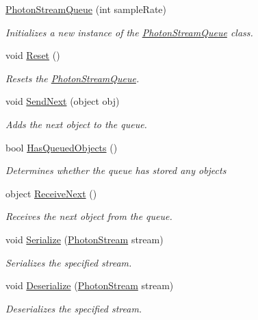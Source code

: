 \begin{DoxyCompactItemize}
\item 
\hyperlink{class_photon_stream_queue_a1c2a5d3c8a990b78b07650b0e1370eeb}{Photon\+Stream\+Queue} (int sample\+Rate)
\begin{DoxyCompactList}\small\item\em Initializes a new instance of the \hyperlink{class_photon_stream_queue}{Photon\+Stream\+Queue} class. \end{DoxyCompactList}\item 
void \hyperlink{class_photon_stream_queue_a8034450d68cdf1a16e3f33a53b0ad2dd}{Reset} ()
\begin{DoxyCompactList}\small\item\em Resets the \hyperlink{class_photon_stream_queue}{Photon\+Stream\+Queue}. \end{DoxyCompactList}\item 
void \hyperlink{class_photon_stream_queue_acbae2dbbf5e5b4fd8c589fb7019adbf8}{Send\+Next} (object obj)
\begin{DoxyCompactList}\small\item\em Adds the next object to the queue. \end{DoxyCompactList}\item 
bool \hyperlink{class_photon_stream_queue_a9e8e0b7a881aea56cb21148def4b5c5d}{Has\+Queued\+Objects} ()
\begin{DoxyCompactList}\small\item\em Determines whether the queue has stored any objects \end{DoxyCompactList}\item 
object \hyperlink{class_photon_stream_queue_ab9b77bbe2ddf53638dd96b63af8a533c}{Receive\+Next} ()
\begin{DoxyCompactList}\small\item\em Receives the next object from the queue. \end{DoxyCompactList}\item 
void \hyperlink{class_photon_stream_queue_ae75447cd718116990e0d0304eebc6935}{Serialize} (\hyperlink{class_photon_stream}{Photon\+Stream} stream)
\begin{DoxyCompactList}\small\item\em Serializes the specified stream. \end{DoxyCompactList}\item 
void \hyperlink{class_photon_stream_queue_a40bc2e04c1641f36da8cb36423fd13c3}{Deserialize} (\hyperlink{class_photon_stream}{Photon\+Stream} stream)
\begin{DoxyCompactList}\small\item\em Deserializes the specified stream. \end{DoxyCompactList}\end{DoxyCompactItemize}


